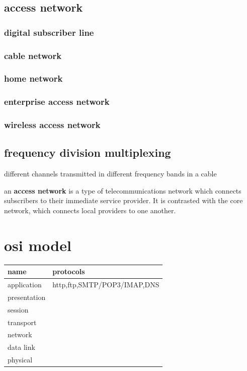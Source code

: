 \documentclass[a4paper,12pt]{article}
\begin{document}
\subsection{access network}
\label{sec:org3ca6bc7}
\subsubsection{digital subscriber line}
\label{sec:org3056271}
\subsubsection{cable network}
\label{sec:org761776a}
\subsubsection{home network}
\label{sec:org8c7ea26}
\subsubsection{enterprise access network}
\label{sec:org769fe45}
\subsubsection{wireless access network}
\label{sec:orgac18c1d}
\subsection{frequency division multiplexing}
\label{sec:orgb619a4e}
different channels transmitted in different frequency bands in a cable\\
\begin{definition}
an \textbf{access network} is a type of telecommunications network which connects subscribers to their immediate service provider. It is contrasted with the core network, which connects local providers to one another.\\
\end{definition}
\section{osi model}
\label{sec:org5b0a109}
\begin{center}
\begin{tabular}{ll}
name & protocols\\
\hline
application & http,ftp,SMTP/POP3/IMAP,DNS\\
presentation & \\
session & \\
transport & \\
network & \\
data link & \\
physical & \\
\end{tabular}
\end{center}
\end{document}
